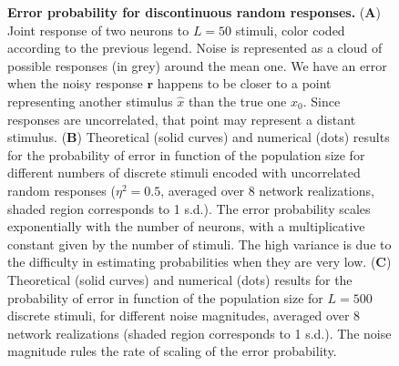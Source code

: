 \documentclass[a4paper]{article}
\begin{document}
\clearpage
\begin{figure}
\centering
{}
\caption{\textbf{Error probability for discontinuous random responses.} (\textbf{A}) Joint response of two neurons to $L=50$ stimuli, color coded according to the previous legend. Noise is represented as a cloud of possible responses (in grey) around the mean one. We have an error when the noisy response $\mathbf{r}$ happens to be closer to a point representing another stimulus $\hat{x}$ than the true one $x_0$. Since responses are uncorrelated, that point may represent a distant stimulus. (\textbf{B}) Theoretical (solid curves) and numerical (dots) results for the probability of error in function of the population size for different numbers of discrete stimuli encoded with uncorrelated random responses ($\eta^2=0.5$, averaged over 8 network realizations, shaded region corresponds to 1 s.d.). The error probability scales exponentially with the number of neurons, with a multiplicative constant given by the number of stimuli. The high variance is due to the difficulty in estimating probabilities when they are very low. (\textbf{C})  Theoretical (solid curves) and numerical (dots) results for the probability of error in function of the population size for $L=500$ discrete stimuli, for different noise magnitudes, averaged over 8 network realizations (shaded region corresponds to 1 s.d.). The noise magnitude rules the rate of scaling of the error probability.}
\label{Fig:2}
\end{figure}

\clearpage
\end{document}
